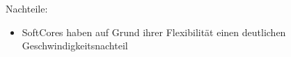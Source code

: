 Nachteile:
\begin{itemize}
  \item SoftCores haben auf Grund ihrer Flexibilität einen deutlichen Geschwindigkeitsnachteil
\end{itemize}

%
%
%
%
%
%
%




